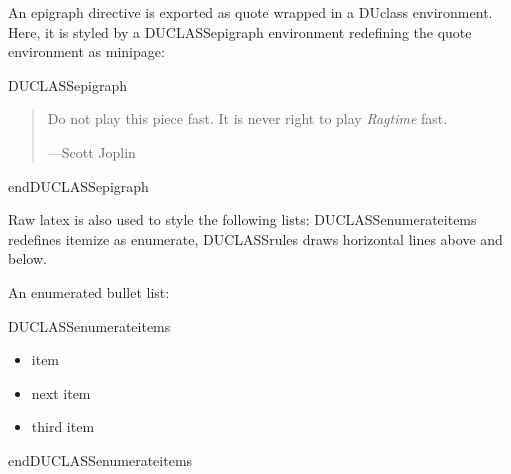 \documentclass[a4paper]{memoir}
\newenvironment{DUclass}[1]%
  {%
   \def\DocutilsClassFunctionName{DUCLASS#1}
     \csname \DocutilsClassFunctionName \endcsname}%
  {\csname end\DocutilsClassFunctionName \endcsname}%
\begin{document}
An \textquotedbl{}epigraph\textquotedbl{} directive is exported as \textquotedbl{}quote\textquotedbl{} wrapped in a \textquotedbl{}DUclass\textquotedbl{}
environment. Here, it is styled by a \textquotedbl{}DUCLASSepigraph\textquotedbl{} environment
redefining the \textquotedbl{}quote\textquotedbl{} environment as \textquotedbl{}minipage\textquotedbl{}:

\newcommand*{\DUCLASSepigraph}{%
  \renewenvironment{quote}{\vspace{1em}
                           \footnotesize\hfill{}%
                           \begin{minipage}{0.4\columnwidth}}%
                          {\end{minipage}\vskip\baselineskip}}

\begin{DUclass}{epigraph}
\begin{quote}
Do not play this piece fast. It is never right to play \emph{Ragtime} fast.
\nopagebreak

\raggedleft —Scott Joplin
\end{quote}
\end{DUclass}

Raw latex is also used to style the following lists: \textquotedbl{}DUCLASSenumerateitems\textquotedbl{}
redefines \textquotedbl{}itemize\textquotedbl{} as \textquotedbl{}enumerate\textquotedbl{}, \textquotedbl{}DUCLASSrules\textquotedbl{} draws horizontal lines
above and below.

\newcommand*{\DUCLASSenumerateitems}{%
  \renewenvironment{itemize}{\begin{enumerate}}%
                            {\end{enumerate}}%
}

\newenvironment{DUCLASSrules}%
               {\noindent\rule[0.5ex]{1\columnwidth}{1pt}}%
               {\noindent\rule[0.5ex]{1\columnwidth}{1pt}}

An \textquotedbl{}enumerated\textquotedbl{} bullet list:

\begin{DUclass}{enumerateitems}
\begin{itemize}
\item item

\item next item

\item third item
\end{itemize}
\end{DUclass}
\end{document}
